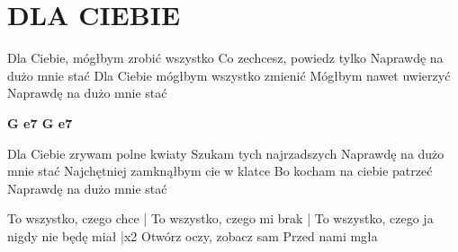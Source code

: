 \documentclass[../../../songbook.tex]{subfiles}
\begin{document}
\TabPositions{8cm} %
\section*{DLA CIEBIE}
{}
\vspace{0.5cm}
Dla Ciebie, mógłbym zrobić wszystko 	 \newline   
Co zechcesz, powiedz tylko 				 \newline
Naprawdę na dużo mnie stać 				 \newline
Dla Ciebie mógłbym wszystko zmienić 	 \newline
Mógłbym nawet uwierzyć 					 \newline
Naprawdę na dużo mnie stać 				 \newline

{\color{red}\textbf{G   e7   G   e7} } \newline

Dla Ciebie zrywam polne kwiaty \newline
Szukam tych najrzadszych \newline
Naprawdę na dużo mnie stać \newline
Najchętniej zamknąłbym cie w klatce \newline
Bo kocham na ciebie patrzeć \newline
Naprawdę na dużo mnie stać \newline

\-\hspace{1cm} To wszystko, czego chce 				 | \newline
\-\hspace{1cm} To wszystko, czego mi brak 				    \quad  | \newline
\-\hspace{1cm} To wszystko, czego ja nigdy nie będę miał   \quad |x2 \newline
\-\hspace{1cm} Otwórz oczy, zobacz sam 			 \newline
\-\hspace{1cm} Przed nami mgła 							   \newline
\end{document}
